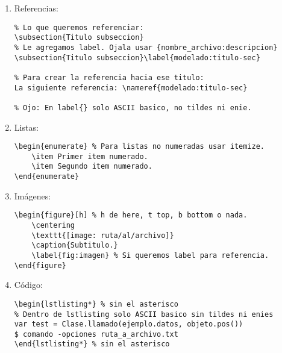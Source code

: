 \begin{enumerate}
\begin{enumerate}
\begin{lstlisting}
Los parrafos se separan con una linea en blanco.
	\end{lstlisting}

	\item Quitar sangría:
	\begin{lstlisting}
\noindent Primera linea sin sangria.
	\end{lstlisting}
	\end{enumerate}

\item Referencias:
\begin{lstlisting}
% Lo que queremos referenciar:
\subsection{Titulo subseccion}
% Le agregamos label. Ojala usar {nombre_archivo:descripcion}
\subsection{Titulo subseccion}\label{modelado:titulo-sec}

% Para crear la referencia hacia ese titulo:
La siguiente referencia: \nameref{modelado:titulo-sec}

% Ojo: En label{} solo ASCII basico, no tildes ni enie.
\end{lstlisting}

\item Listas:
\begin{lstlisting}
\begin{enumerate} % Para listas no numeradas usar itemize.
    \item Primer item numerado.
    \item Segundo item numerado.
\end{enumerate}
\end{lstlisting}

\item Imágenes:
\begin{lstlisting}
\begin{figure}[h] % h de here, t top, b bottom o nada.
    \centering
    \texttt{[image: ruta/al/archivo]}
    \caption{Subtitulo.}
    \label{fig:imagen} % Si queremos label para referencia.
\end{figure}
\end{lstlisting}

\item Código:
\begin{lstlisting}
\begin{lstlisting*} % sin el asterisco
% Dentro de lstlisting solo ASCII basico sin tildes ni enies
var test = Clase.llamado(ejemplo.datos, objeto.pos())
$ comando -opciones ruta_a_archivo.txt
\end{lstlisting*} % sin el asterisco
\end{lstlisting}


\end{enumerate}
